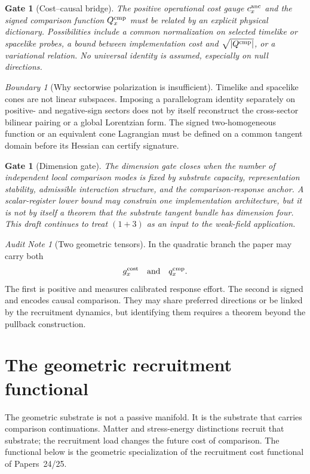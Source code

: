 \documentclass[11pt]{article}
\newtheorem{gate}[theorem]{Gate}
\theoremstyle{remark}
\newtheorem{warning}[theorem]{Boundary}
\newtheorem{audit}[theorem]{Audit Note}
\newcommand{\Gcost}{g^{\rm cost}}
\newcommand{\Qcmp}{Q^{\rm cmp}}
\begin{document}
\begin{gate}[Cost--causal bridge]
The positive operational cost gauge $c_x^{\rm anc}$ and the signed comparison function $\Qcmp_x$ must be related by an explicit physical dictionary.  Possibilities include a common normalization on selected timelike or spacelike probes, a bound between implementation cost and $\sqrt{|\Qcmp|}$, or a variational relation.  No universal identity is assumed, especially on null directions.
\end{gate}

\begin{warning}[Why sectorwise polarization is insufficient]
Timelike and spacelike cones are not linear subspaces.  Imposing a parallelogram identity separately on positive- and negative-sign sectors does not by itself reconstruct the cross-sector bilinear pairing or a global Lorentzian form.  The signed two-homogeneous function or an equivalent cone Lagrangian must be defined on a common tangent domain before its Hessian can certify signature.
\end{warning}

\begin{gate}[Dimension gate]
The dimension gate closes when the number of independent local comparison modes is fixed by substrate capacity, representation stability, admissible interaction structure, and the comparison-response anchor.  A scalar-register lower bound may constrain one implementation architecture, but it is not by itself a theorem that the substrate tangent bundle has dimension four.  This draft continues to treat $(1+3)$ as an input to the weak-field application.
\end{gate}

\begin{audit}[Two geometric tensors]
In the quadratic branch the paper may carry both
\[
        \Gcost_x\quad\text{and}\quad q_x^{\rm cmp}.
\]
The first is positive and measures calibrated response effort.  The second is signed and encodes causal comparison.  They may share preferred directions or be linked by the recruitment dynamics, but identifying them requires a theorem beyond the pullback construction.
\end{audit}

\section{The geometric recruitment functional}

The geometric substrate is not a passive manifold.  It is the substrate that carries comparison continuations.  Matter and stress-energy distinctions recruit that substrate; the recruitment load changes the future cost of comparison.  The functional below is the geometric specialization of the recruitment cost functional of Papers~24/25.
\end{document}
